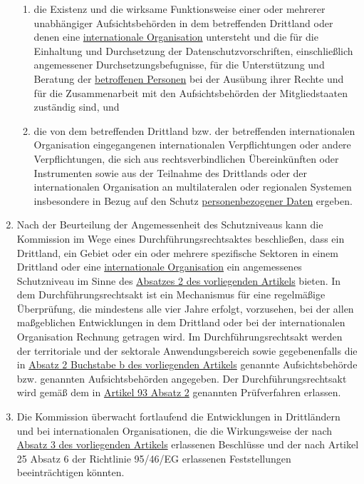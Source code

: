 \begin{enumerate}
\begin{enumerate}
    \item die Existenz und die wirksame Funktionsweise einer oder mehrerer unabhängiger Aufsichtsbehörden in dem
     betreffenden Drittland oder denen eine \hyperref[itm:04-29]{internationale Organisation} untersteht und die für die Einhaltung und
     Durchsetzung der Datenschutzvorschriften, einschließlich angemessener Durchsetzungsbefugnisse, für die
     Unterstützung und Beratung der \hyperref[itm:04-1]{betroffenen Personen} bei der Ausübung ihrer Rechte und für die Zusammenarbeit mit
     den Aufsichtsbehörden der Mitgliedstaaten zuständig sind, und
    \label{itm:45-2b}

    \item die von dem betreffenden Drittland bzw. der betreffenden internationalen Organisation eingegangenen
     internationalen Verpflichtungen oder andere Verpflichtungen, die sich aus rechtsverbindlichen Übereinkünften oder
     Instrumenten sowie aus der Teilnahme des Drittlands oder der internationalen Organisation an multilateralen oder
     regionalen Systemen insbesondere in Bezug auf den Schutz \hyperref[itm:04-1]{personenbezogener Daten} ergeben.
    \label{itm:45-2c}

  \end{enumerate}

  \item Nach der Beurteilung der Angemessenheit des Schutzniveaus kann die Kommission im Wege eines
   Durchführungsrechtsaktes beschließen, dass ein Drittland, ein Gebiet oder ein oder mehrere spezifische Sektoren in
   einem Drittland oder eine \hyperref[itm:04-29]{internationale Organisation} ein angemessenes Schutzniveau im Sinne des \hyperref[itm:45-2]
   {Absatzes 2 des vorliegenden Artikels} bieten. In dem Durchführungsrechtsakt ist ein Mechanismus für eine
   regelmäßige Überprüfung, die mindestens alle vier Jahre erfolgt, vorzusehen, bei der allen maßgeblichen
   Entwicklungen in dem Drittland oder bei der internationalen Organisation Rechnung getragen wird. Im
   Durchführungsrechtsakt werden der territoriale und der sektorale Anwendungsbereich sowie gegebenenfalls die in
   \hyperref[itm:45-2b]{Absatz 2 Buchstabe b des vorliegenden Artikels} genannte Aufsichtsbehörde bzw. genannten
   Aufsichtsbehörden angegeben. Der Durchführungsrechtsakt wird gemäß dem in \hyperref[itm:93-2]{Artikel 93 Absatz 2}
   genannten Prüfverfahren erlassen.
  \label{itm:45-3}

  \item Die Kommission überwacht fortlaufend die Entwicklungen in Drittländern und bei internationalen Organisationen,
   die die Wirkungsweise der nach \hyperref[itm:45-3]{Absatz 3 des vorliegenden Artikels} erlassenen Beschlüsse und der
   nach Artikel 25 Absatz 6 der Richtlinie 95/46/EG erlassenen Feststellungen beeinträchtigen
   könnten.
  \label{itm:45-4}


\end{enumerate}
